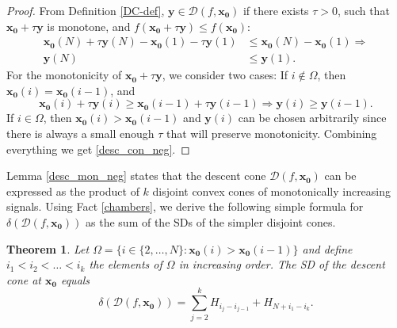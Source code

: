 \documentclass[11pt]{article}
\newcommand{\be}{\begin{equation}}
\newcommand{\ee}{\end{equation}}
\newtheorem{theorem}[proposition]{Theorem}
\begin{document}
\begin{proof}
	From Definition \ref{DC-def}, $\bm{y} \in \mathcal{D}(f,\bm{x_0})$ if there exists $\tau > 0$, such that $\bm{x_0} + \tau\bm{y}$ is monotone, and $f(\bm{x_0} + \tau\bm{y}) \leq f(\bm{x_0})$:
	\[ \begin{split}
		\bm{x_0}(N) + \tau\bm{y}(N) - \bm{x_0}(1) -  \tau\bm{y}(1) &\leq \bm{x_0}(N) - \bm{x_0}(1) \Rightarrow \\ \bm{y}(N) &\leq \bm{y}(1).
		\label{dec-cond}
	\end{split}
	\]
	For the monotonicity of $\bm{x_0} + \tau\bm{y}$, we consider two cases: If $i \not\in \Omega$, then $\bm{x_0}(i) = \bm{x_0}(i-1)$, and %
			\[
				\bm{x_0}(i) + \tau\bm{y}(i) \geq \bm{x_0}(i-1)+ \tau\bm{y}(i-1) \Rightarrow \bm{y}(i) \geq \bm{y}(i-1).
			\]
	If $i \in \Omega$, then $\bm{x_0}(i) > \bm{x_0}(i-1)$ and $\bm{y}(i)$ can be chosen arbitrarily since there is always a small enough $\tau$ that will preserve monotonicity.
	Combining everything we get \eqref{desc_con_neg}. 
\end{proof}

\noindent Lemma \ref{desc_mon_neg} states that the descent cone $\mathcal{D}(f,\bm{x_0})$ can be expressed as the product of $k$ disjoint convex cones of monotonically increasing signals. Using Fact \ref{chambers}, we derive the following simple formula for $\delta(\mathcal{D}(f,\bm{x_0}))$ as the sum of the SDs of the simpler disjoint cones.
\begin{theorem}
Let $\Omega = \{ i \in \{2,\ldots,N\} : \bm{x_0}(i) > \bm{x_0}(i-1) \}$ and define $i_1 < i_2 < \ldots < i_k$ the elements of $\Omega$ in increasing order. %
The SD of the descent cone at $\bm{x_0}$ equals
\be
	\delta(\mathcal{D}(f,\bm{x_0})) =  \sum_{j=2}^{k}H_{i_j-i_{j-1}} + H_{N+i_1-i_k}.
\ee
\end{theorem}
\end{document}
